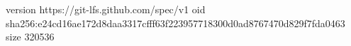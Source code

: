 version https://git-lfs.github.com/spec/v1
oid sha256:e24cd16ae172d8daa3317cfff63f223957718300d0ad8767470d829f7fda0463
size 320536
